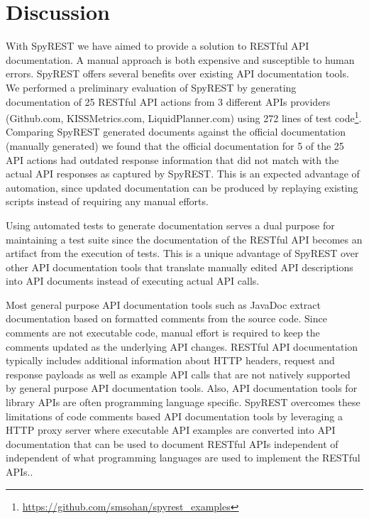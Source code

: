 \section{Discussion}
With SpyREST we have aimed to provide a solution to RESTful API documentation. A manual approach is both expensive and susceptible to human errors. SpyREST offers several benefits over existing API documentation tools. We performed a preliminary evaluation of SpyREST by generating documentation of 25 RESTful API actions from 3 different APIs providers (Github.com, KISSMetrics.com, LiquidPlanner.com) using 272 lines of test code\footnote{\url{https://github.com/smsohan/spyrest_examples}}. Comparing SpyREST generated documents against the official documentation (manually generated) we found that the official documentation for 5 of the 25 API actions had outdated response information that did not match with the actual API responses as captured by SpyREST. This is an expected advantage of automation, since updated documentation can be produced by replaying existing scripts instead of requiring any manual efforts.

Using automated tests to generate documentation serves a dual purpose for maintaining a test suite since the documentation of the RESTful API becomes an artifact from the execution of tests. This is a unique advantage of SpyREST over other API documentation tools that translate manually edited API descriptions into API documents instead of executing actual API calls.

Most general purpose API documentation tools such as JavaDoc extract documentation based on formatted comments from the source code. Since comments are not executable code, manual effort is required to keep the comments updated as the underlying API changes. RESTful API documentation typically includes additional information about HTTP headers, request and response payloads as well as example API calls that are not natively supported by general purpose API documentation tools. Also, API documentation tools for library APIs are often programming language specific. SpyREST overcomes these limitations of code comments based API documentation tools by leveraging a HTTP proxy server where executable API examples are converted into API documentation that can be used to document RESTful APIs independent of independent of what programming languages are used to implement the RESTful APIs..

